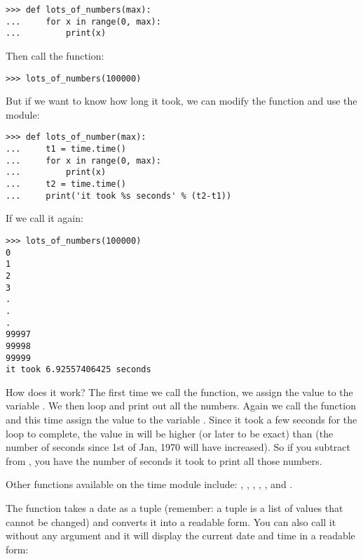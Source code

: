 \begin{listing}
\begin{verbatim}
>>> def lots_of_numbers(max):
...     for x in range(0, max):
...         print(x)
\end{verbatim}
\end{listing}

\noindent
Then call the function:

\begin{listing}
\begin{verbatim}
>>> lots_of_numbers(100000)
\end{verbatim}
\end{listing}

\noindent
But if we want to know how long it took, we can modify the function and use the  module:

\begin{listing}
\begin{verbatim}
>>> def lots_of_number(max):
...     t1 = time.time()
...     for x in range(0, max):
...         print(x)
...     t2 = time.time()
...     print('it took %s seconds' % (t2-t1))
\end{verbatim}
\end{listing}

\noindent
If we call it again:

\begin{listingignore}
\begin{verbatim}
>>> lots_of_numbers(100000)
0
1
2
3
.
.
.
99997
99998
99999
it took 6.92557406425 seconds
\end{verbatim}
\end{listingignore}

\noindent
How does it work?  The first time we call the  function, we assign the value to the variable . We then loop and print out all the numbers. Again we call the  function and this time assign the value to the variable . Since it took a few seconds for the loop to complete, the value in  will be higher (or later to be exact) than  (the number of seconds since 1st of Jan, 1970 will have increased). So if you subtract  from , you have the number of seconds it took to print all those numbers.

Other functions available on the time module include: , , , , , and .

The function  takes a date as a tuple (remember: a tuple is a list of values that cannot be changed) and converts it into a readable form. You can also call it without any argument and it will display the current date and time in a readable form:

